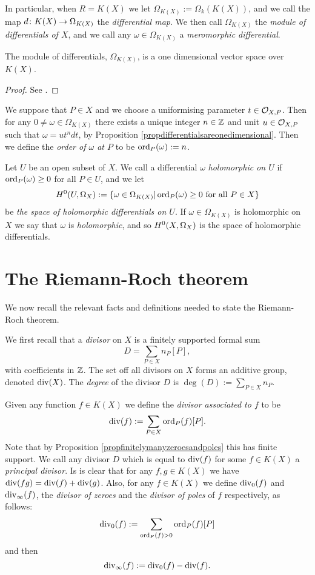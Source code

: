 In particular, when $R = K(X)$ we let $\Omega_{K(X)} := \Omega_k(K(X))$, and we call the map $d \colon K(X) \rightarrow \Omega_{K(X)}$ the \emph{differential map}.
We then call $\Omega_{K(X)}$ the \emph{module of differentials of $X$}, and we call any $ \omega \in \Omega_{K(X)}$ a \emph{meromorphic differential}.

    \begin{prop}\label{propdifferentialsareonedimensional}
    The module of differentials, $\Omega_{K(X)}$, is a one dimensional vector space over $K(X)$.
    \end{prop}
    \begin{proof}
    See \cite[Prop. 1.5.9]{stichtenoth}.
    \end{proof}

We suppose that $P \in X$ and we choose a uniformising parameter $t \in {\cal O}_{X,P}$.
Then for any $ 0 \neq \omega \in \Omega_{K(X)}$ there exists a unique integer $n \in {\mathbb Z}$ and unit $u \in {\cal O}_{X,P}$ such that $\omega = ut^ndt$, by Proposition \ref{propdifferentialsareonedimensional}.
Then we define the \emph{order of $\omega$ at $P$} to be $\operatorname{ord}_P(\omega) := n$.

Let $U$ be an open subset of $X$.
We call a differential $\omega$ \emph{holomorphic on $U$} if $\operatorname{ord}_P(\omega) \geq 0$ for all $P \in U$, and we let
    \[
    H^0(U, \Omega_X) := \{ \omega \in \Omega_{K(X)} | \operatorname{ord}_P(\omega) \geq 0\ \text{for all}\ P \in X\}
    \]
be \emph{the space of holomorphic differentials on $U$}.
If $\omega \in \Omega_{K(X)}$ is holomorphic on $X$ we say that $\omega$ is \emph{holomorphic}, and so ${H^0(X,\Omega_X)}$ is the space of holomorphic differentials.

\section{The Riemann-Roch theorem}

We now recall the relevant facts and definitions needed to state the Riemann-Roch theorem.

We first recall that a \emph{divisor} on $X$ is a finitely supported formal sum 
    \[
    D = \sum_{P \in X} n_P[P],
    \]
with coefficients in ${\mathbb Z}$.
The set off all divisors on $X$ forms an additive group, denoted $\operatorname{div} (X)$.
The \emph{degree} of the divisor $D$ is $\deg(D) := \sum_{P \in X} n_P$.


Given any function $f \in K(X)$ we define the \emph{divisor associated to $f$} to be
    \[
    \operatorname{div}(f) := \sum_{P \in X} \operatorname{ord}_P(f) [P].
    \]
Note that by Proposition \ref{propfinitelymanyzeroesandpoles} this has finite support.
We call any divisor $D$ which is equal to $\operatorname{div}(f)$ for some $f \in K(X)$ a \emph{principal divisor}.
Is is clear that for any $f, g \in K(X)$ we have $\operatorname{div}(fg) = \operatorname{div}(f) + \operatorname{div}(g)$.
Also, for any $f \in K(X)$ we define $\operatorname{div}_0(f)$ and $\operatorname{div}_\infty (f)$, the \emph{divisor of zeroes} and the \emph{divisor of poles} of $f$ respectively, as follows:
    \[
    \operatorname{div}_0(f) := \sum_{\operatorname{ord}_P(f) >0} \operatorname{ord}_P(f)[P]
    \]
and then
    \[
    \operatorname{div}_\infty(f) := \operatorname{div}_0(f) - \operatorname{div}(f).
    \]

